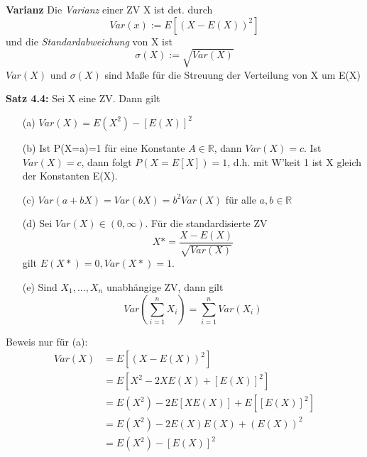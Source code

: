 \documentclass[a4paper,11pt]{article}
\begin{document}
\vspace{6pt}
\noindent\textbf{Varianz}
\newline Die \textit{Varianz} einer ZV X ist det. durch 
\[Var(x):=E[(X-E(X))^2]\]
und die \textit{Standardabweichung} von X ist 
\[\sigma(X):=\sqrt{Var(X)}\]
$Var(X)$ und $\sigma(X)$ sind Maße für die Streuung der Verteilung von X um E(X)

\vspace{6pt}
\noindent\textbf{Satz 4.4:} Sei X eine ZV. Dann gilt
\begin{itemize}
\item[(a)] $Var(X)=E(X^2)-[E(X)]^2$
\item[(b)] Ist P(X=a)=1 für eine Konstante $A\in\mathbb{R}$, dann $Var(X)=c$.
\newline Ist $Var(X)=c$, dann folgt $P(X=E[X])=1$, d.h. mit W'keit 1 ist X gleich der Konstanten E(X).
\item[(c)] $Var(a+bX)=Var(bX)=b^2Var(X)$ für alle $a,b\in\mathbb{R}$
\item[(d)] Sei $Var(X)\in(0,\infty)$. Für die standardisierte ZV 
\[X* = \frac{X-E(X)}{\sqrt{Var(X)}}\]
gilt $E(X*)=0, Var(X*)=1$.
\item[(e)] Sind $X_1,\dots,X_n$ unabhängige ZV, dann gilt
\[Var(\sum_{i=1}^{n}X_i)=\sum_{i=1}^{n}Var(X_i)\]
\end{itemize}

\noindent Beweis nur für (a):
\begin{align*}
Var(X) &= E[(X-E(X))^2]\\
&= E[X^2-2XE(X)+[E(X)]^2]\\
&= E(X^2)-2E[XE(X)]+E[[E(X)]^2]\\
&= E(X^2) - 2E(X)E(X) + (E(X))^2\\
&= E(X^2)-[E(X)]^2\\
\end{align*}
\end{document}
